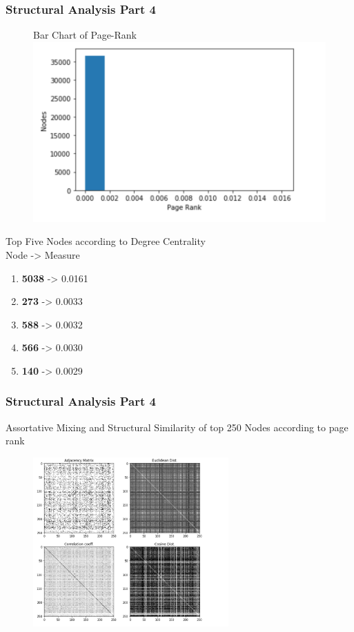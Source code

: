 \documentclass{beamer}
\begin{document}
\begin{frame}
\frametitle{Structural Analysis Part 4}
	\begin{multicols}{2}
		\begin{figure}
	        {\tiny Bar Chart of Page-Rank}
		\includegraphics[width=\columnwidth]{page-rank.png}
		\end{figure}
		\columnbreak
		{\tiny Top Five Nodes according to Degree Centrality} \\
		Node  ->  Measure
		\begin{enumerate} 
		\item \textbf{5038} -> 0.0161
		\item \textbf{273} -> 0.0033
		\item \textbf{588} -> 0.0032
		\item \textbf{566} -> 0.0030
		\item \textbf{140} -> 0.0029
		\end{enumerate} 
	\end{multicols}
\end{frame}

\begin{frame}
\frametitle{Structural Analysis Part 4}
	\begin{center}
	 	{\tiny Assortative Mixing and Structural Similarity of top 250 Nodes according to page rank}
	\end{center}
	 \begin{figure}
		\includegraphics[width=75mm]{adj.png}
	\end{figure}
\end{frame}
\end{document}
